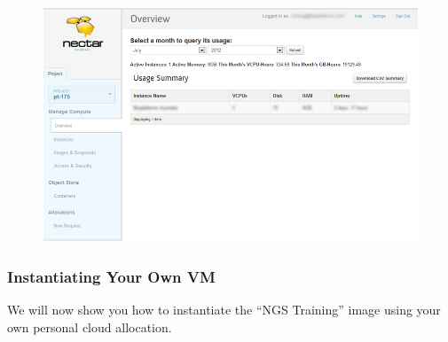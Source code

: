 \begin{enumerate}
  \begin{figure}[H]
    \centering
    \includegraphics[scale=0.5]{handout/nectar/dashboard_overview.png}
    \caption{\label{fig:dashboard_overview}}
  \end{figure}
\end{enumerate}

\subsubsection{Instantiating Your Own VM}
We will now show you how to instantiate the ``NGS Training'' image using your
own personal cloud allocation.

